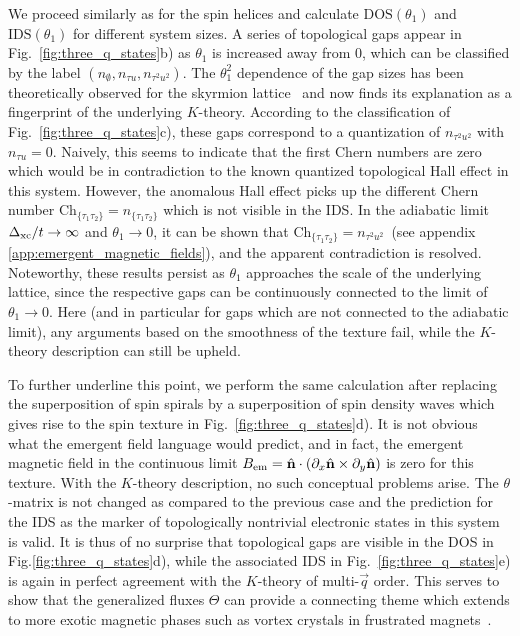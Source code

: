 \documentclass[
    10pt,
    aps,
    prb,
	longbibliography,
    twocolumn,
    floatfix,
    superscriptaddress,
]{revtex4-2}
\begin{document}
We proceed similarly as for the spin helices and calculate $\mathrm{DOS}(\theta_1)$ and $\mathrm{IDS}(\theta_1)$ for different system sizes.
A series of topological gaps appear in Fig.~\ref{fig:three_q_states}b) as $\theta_1$ is increased away from $0$, which can be classified by the label $(n_\emptyset, n_{\tau u}, n_{\tau^2u^2})$.
The $\theta_1^2$ dependence of the gap sizes has been theoretically observed for the skyrmion lattice~\cite{Hamamoto2015} and now finds its explanation as a fingerprint of the underlying $K$-theory.
According to the classification of Fig.~\ref{fig:three_q_states}c), 
these gaps correspond to a quantization of $n_{\tau^2u^2}$ with $n_{\tau u}=0$.
Naively, this seems to indicate that the first Chern numbers are zero which would be in contradiction to the known quantized topological Hall effect in this system.
However, the anomalous Hall effect picks up the different Chern number $\mathrm{Ch}_{ \lbrace \tau_1 \tau_2 \rbrace } = n_{ \lbrace \tau_1 \tau_2 \rbrace }$ \cite{Prodan2017} which is not visible in the IDS.
In the adiabatic limit $\Delta_\mathrm{xc}/t \to \infty$ and $\theta_1 \to 0$, it can be shown that $\mathrm{Ch}_{ \lbrace \tau_1 \tau_2 \rbrace } = n_{\tau^2u^2}$~(see appendix \ref{app:emergent_magnetic_fields}), and the apparent contradiction is resolved.
Noteworthy, these results persist as $\theta_1$ approaches the scale of the underlying lattice, since the respective gaps can be continuously connected to the limit of $\theta_1 \to 0$.
Here (and in particular for gaps which are not connected to the adiabatic limit), any arguments based on the smoothness of the texture fail, while the $K$-theory description can still be upheld.

To further underline this point, we perform the same calculation after replacing the superposition of spin spirals by a superposition of spin density waves which gives rise to the spin texture in Fig.~\ref{fig:three_q_states}d). 
It is not obvious what the emergent field language would predict, and  
in fact, the emergent magnetic field in the continuous limit  $B_\mathrm{em} = \hat{\mathbf{n}} \cdot(\partial_x \hat{\mathbf{n}} \times \partial_y \hat{\mathbf{n}})$ is zero for this texture.
With the $K$-theory description, no such conceptual problems arise.
The $\theta$-matrix is not changed as compared to the previous case and the prediction for the IDS as the marker of topologically nontrivial electronic states in this system is valid. 
It is thus of no surprise that topological gaps are visible in the DOS in Fig.\ref{fig:three_q_states}d), while the associated IDS in Fig.~\ref{fig:three_q_states}e) is again in perfect agreement with the $K$-theory of multi-$\vec{q}$ order.
This serves to show that the generalized fluxes $\Theta$ can provide a connecting theme which extends to more exotic magnetic phases such as vortex crystals in frustrated magnets~\cite{Wang2015}.
\end{document}
